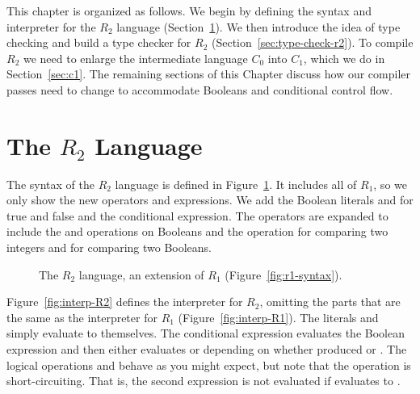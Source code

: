 \documentclass[11pt]{book}
\newcommand{\gray}[1]{{\color{lightgray} #1}}
\begin{document}
This chapter is organized as follows.  We begin by defining the syntax
and interpreter for the $R_2$ language (Section~\ref{sec:r2-lang}). We
then introduce the idea of type checking and build a type checker for
$R_2$ (Section~\ref{sec:type-check-r2}). To compile $R_2$ we need to
enlarge the intermediate language $C_0$ into $C_1$, which we do in
Section~\ref{sec:c1}. The remaining sections of this Chapter discuss
how our compiler passes need to change to accommodate Booleans and
conditional control flow.


\section{The $R_2$ Language}
\label{sec:r2-lang}

The syntax of the $R_2$ language is defined in
Figure~\ref{fig:r2-syntax}. It includes all of $R_1$, so we only show
the new operators and expressions. We add the Boolean literals
 and  for true and false and the conditional
expression. The operators are expanded to include the  and
 operations on Booleans and the  operation for
comparing two integers and for comparing two Booleans.

\begin{figure}[tbp]
\centering
\fbox{
\begin{minipage}{0.96\textwidth}
\[
\begin{array}{lcl}
  \Exp &::=& \gray{\Int \mid (\key{read}) \mid (\key{-}\;\Exp) \mid (\key{+} \; \Exp\;\Exp)}  \\
     &\mid&  \gray{\Var \mid \LET{\Var}{\Exp}{\Exp}} \mid \key{\#t} \mid \key{\#f} \mid
      (\key{and}\;\Exp\;\Exp) \mid (\key{not}\;\Exp) \\
      &\mid& (\key{eq?}\;\Exp\;\Exp) \mid \IF{\Exp}{\Exp}{\Exp} \\
  R_2 &::=& (\key{program} \; \Exp)
\end{array}
\]
\end{minipage}
}
\caption{The $R_2$ language, an extension of $R_1$
  (Figure~\ref{fig:r1-syntax}).}
\label{fig:r2-syntax}
\end{figure}

Figure~\ref{fig:interp-R2} defines the interpreter for $R_2$, omitting
the parts that are the same as the interpreter for $R_1$
(Figure~\ref{fig:interp-R1}). The literals  and 
simply evaluate to themselves. The conditional expression  evaluates the Boolean expression  and then
either evaluates  or  depending on whether
 produced  or . The logical operations
 and  behave as you might expect, but note that
the  operation is short-circuiting. That is, the second
expression  is not evaluated if  evaluates to
.
\end{document}
